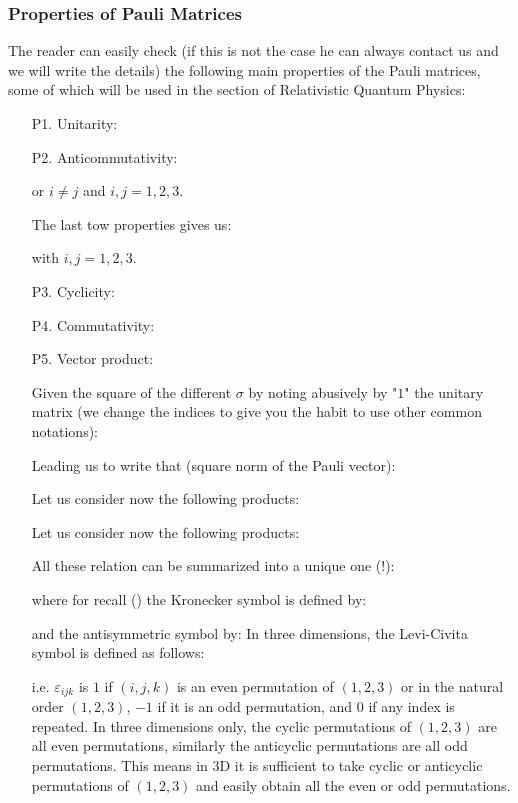 	\subsubsection{Properties of Pauli Matrices}
	The reader can easily check (if this is not the case he can always contact us and we will write the details) the following main properties of the Pauli matrices, some of which will be used in the section of Relativistic Quantum Physics:
	\begin{enumerate}
		\item[P1.] Unitarity:
		

		\item[P2.] Anticommutativity:
		
		or $i\neq j$ and $i,j=1,2,3$.

		The last tow properties gives us:
		
		with $i,j=1,2,3$.

		\item[P3.] Cyclicity:
		

		\item[P4.] Commutativity:
		
		
		\item[P5.] Vector product:
		
		Given the square of the different $\sigma$ by noting abusively by "$1$" the unitary matrix (we change the indices to give you the habit to use other common notations):
		
		Leading us to write that (square norm of the Pauli vector):
		
		Let us consider now the following products:
		
		Let us consider now the following products:
		
		All these relation can be summarized into a unique one (!):
		
		where for recall () the Kronecker symbol is defined by:
		
		and the antisymmetric symbol by:
		In three dimensions, the Levi-Civita symbol is defined as follows:
		
		i.e.  $\varepsilon_{ijk}$  is $1$ if $(i, j, k)$ is an even permutation of $(1,2,3)$ or in the natural order $(1,2,3)$, $-1$ if it is an odd permutation, and $0$ if any index is repeated. In three dimensions only, the cyclic permutations of $(1,2,3)$ are all even permutations, similarly the anticyclic permutations are all odd permutations. This means in 3D it is sufficient to take cyclic or anticyclic permutations of $(1,2,3)$ and easily obtain all the even or odd permutations.
		

\end{enumerate}
